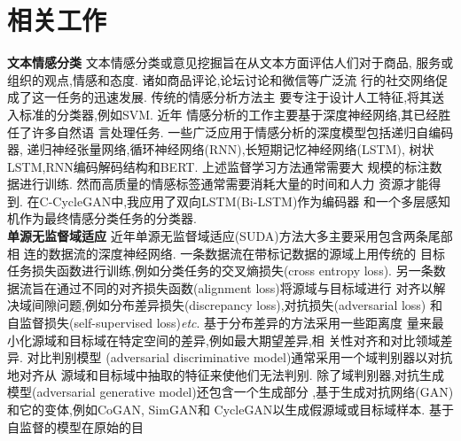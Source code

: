 

\chapter{相关工作} 
\label{chpt:relatedwork}

\textbf{文本情感分类} 文本情感分类或意见挖掘旨在从文本方面评估人们对于商品,
服务或组织的观点,情感和态度\cite{zhang2018deep}. 诸如商品评论,论坛讨论和微信等广泛流
行的社交网络促成了这一任务的迅速发展\cite{zhang2018deep,chen2019emoji}. 传统的情感分析方法主
要专注于设计人工特征\cite{pang2008opinion,mohammad2013nrc},将其送入标准的分类器,例如SVM. 近年
情感分析的工作主要基于深度神经网络\cite{zhang2018deep,wang2018sentiment},其已经胜任了许多自然语
言处理任务. 一些广泛应用于情感分析的深度模型包括递归自编码器\cite{socher2011semi,dong2014adaptive,qian2015learning},
递归神经张量网络\cite{socher2013recursive},循环神经网络(RNN)\cite{cho2014learning},长短期记忆神经网络(LSTM)\cite{hochreiter1997long},
树状LSTM\cite{tai2015improved},RNN编码解码结构\cite{cho2014learning}和BERT\cite{devlin2019bert}. 上述监督学习方法通常需要大
规模的标注数据进行训练. 然而高质量的情感标签通常需要消耗大量的时间和人力
资源才能得到. 在C-CycleGAN中,我应用了双向LSTM(Bi-LSTM)\cite{hochreiter1997long}作为编码器
和一个多层感知机作为最终情感分类任务的分类器. \\
\textbf{单源无监督域适应} 近年单源无监督域适应(SUDA)方法大多主要采用包含两条尾部相
连的数据流的深度神经网络\cite{zhuo2017deep,zhao2018adversarial}. 一条数据流在带标记数据的源域上用传统的
目标任务损失函数进行训练,例如分类任务的交叉熵损失(cross entropy loss). 
另一条数据流旨在通过不同的对齐损失函数(alignment loss)将源域与目标域进行
对齐以解决域间隙问题,例如分布差异损失(discrepancy loss),对抗损失(adversarial loss)
和自监督损失(self-supervised loss)\emph{etc}. 基于分布差异的方法采用一些距离度
量来最小化源域和目标域在特定空间的差异,例如最大期望差异\cite{long2015learning,wang2018multi,xi2020domain},相
关性对齐\cite{sun2016return,sun2017correlation,zhuo2017deep}和对比领域差异\cite{kang2019contrastive}. 对比判别模型
(adversarial discriminative model)通常采用一个域判别器以对抗地对齐从
源域和目标域中抽取的特征来使他们无法判别\cite{ganin2016domain,tzeng2017adversarial,chen2017no,shen2017wasserstein,tsai2018learning,huang2018domain,kumar2019adversarial,wu2020unsupervised}. 
除了域判别器,对抗生成模型(adversarial generative model)还包含一个生成部分
,基于生成对抗网络(GAN)\cite{goodfellow2014generative}和它的变体,例如CoGAN\cite{liu2016coupled}, SimGAN\cite{shrivastava2017learning}和
CycleGAN\cite{zhu2017unpaired,zhao2019cycleemotiongan,hoffman2018cycada}以生成假源域或目标域样本. 基于自监督的模型在原始的目
